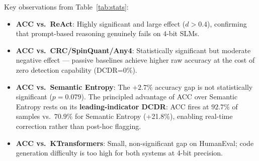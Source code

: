 \documentclass{uai2026}  %
\begin{document}
\begin{table}[htbp]
\centering
\caption{Statistical significance of all ACC vs.\ baseline comparisons
(two-sided Mann-Whitney U; $n$ taken from minimum of pair sizes).
\textbf{***}~$p<0.001$, **~$p<0.01$, *~$p<0.05$, ns~$p\geq0.05$.}
\label{tab:stats}
\footnotesize
{}
\end{table}

Key observations from Table~\ref{tab:stats}:
\begin{itemize}
  \item \textbf{ACC vs.\ ReAct}: Highly significant and large effect ($d>0.4$),
    confirming that prompt-based reasoning genuinely fails on 4-bit SLMs.
  \item \textbf{ACC vs.\ CRC/SpinQuant/Any4}: Statistically significant
    but moderate negative effect --- passive baselines achieve higher raw accuracy
    at the cost of zero detection capability (DCDR=0\%).
  \item \textbf{ACC vs.\ Semantic Entropy}: The $+2.7\%$ accuracy gap
    is not statistically significant ($p=0.079$). The principled advantage of ACC
    over Semantic Entropy rests on its \textbf{leading-indicator DCDR}: ACC
    fires at $92.7\%$ of samples vs.\ $70.9\%$ for Semantic Entropy (+21.8\%),
    enabling real-time correction rather than post-hoc flagging.
  \item \textbf{ACC vs.\ KTransformers}: Small, non-significant gap on HumanEval;
    code generation difficulty is too high for both systems at 4-bit precision.
\end{itemize}
\end{document}
